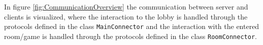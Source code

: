 


In figure \ref{fig:CommunicationOverview} the communication between server and clients is visualized, where the interaction to the lobby is handled through the protocols defined in the class \texttt{MainConnector} and the interaction with the entered room/game is handled through the protocols defined in the class \texttt{RoomConnector}.

